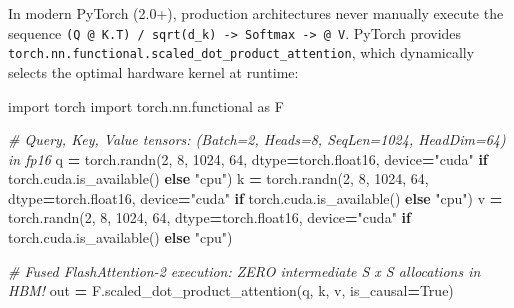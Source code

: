\documentclass[
  letterpaper,
]{scrbook}
\newenvironment{Shaded}{\begin{snugshade}}{\end{snugshade}}
\newcommand{\CommentTok}[1]{\textcolor[rgb]{0.56,0.35,0.01}{\textit{#1}}}
\newcommand{\ControlFlowTok}[1]{\textcolor[rgb]{0.13,0.29,0.53}{\textbf{#1}}}
\newcommand{\DecValTok}[1]{\textcolor[rgb]{0.00,0.00,0.81}{#1}}
\newcommand{\ImportTok}[1]{#1}
\newcommand{\NormalTok}[1]{#1}
\newcommand{\OperatorTok}[1]{\textcolor[rgb]{0.81,0.36,0.00}{\textbf{#1}}}
\newcommand{\StringTok}[1]{\textcolor[rgb]{0.31,0.60,0.02}{#1}}
\newcommand{\VariableTok}[1]{\textcolor[rgb]{0.00,0.00,0.00}{#1}}
\begin{document}
\begin{tcolorbox}[enhanced jigsaw, arc=.35mm, bottomrule=.15mm, bottomtitle=1mm, breakable, colback=white, colbacktitle=quarto-callout-note-color!10!white, colframe=quarto-callout-note-color-frame, coltitle=black, left=2mm, leftrule=.75mm, opacityback=0, opacitybacktitle=0.6, rightrule=.15mm, title=\textcolor{quarto-callout-note-color}{\faInfo}\hspace{0.5em}{PyTorch Systems Bridge:
\texttt{torch.nn.functional.scaled\_dot\_product\_attention} (SDPA)}, titlerule=0mm, toprule=.15mm, toptitle=1mm]

In modern PyTorch (2.0+), production architectures never manually
execute the sequence
\texttt{(Q\ @\ K.T)\ /\ sqrt(d\_k)\ -\textgreater{}\ Softmax\ -\textgreater{}\ @\ V}.
PyTorch provides
\texttt{torch.nn.functional.scaled\_dot\_product\_attention}, which
dynamically selects the optimal hardware kernel at runtime:

\begin{Shaded}
\begin{Highlighting}[]
\ImportTok{import}\NormalTok{ torch}
\ImportTok{import}\NormalTok{ torch.nn.functional }\ImportTok{as}\NormalTok{ F}

\CommentTok{\# Query, Key, Value tensors: (Batch=2, Heads=8, SeqLen=1024, HeadDim=64) in fp16}
\NormalTok{q }\OperatorTok{=}\NormalTok{ torch.randn(}\DecValTok{2}\NormalTok{, }\DecValTok{8}\NormalTok{, }\DecValTok{1024}\NormalTok{, }\DecValTok{64}\NormalTok{, dtype}\OperatorTok{=}\NormalTok{torch.float16, device}\OperatorTok{=}\StringTok{"cuda"} \ControlFlowTok{if}\NormalTok{ torch.cuda.is\_available() }\ControlFlowTok{else} \StringTok{"cpu"}\NormalTok{)}
\NormalTok{k }\OperatorTok{=}\NormalTok{ torch.randn(}\DecValTok{2}\NormalTok{, }\DecValTok{8}\NormalTok{, }\DecValTok{1024}\NormalTok{, }\DecValTok{64}\NormalTok{, dtype}\OperatorTok{=}\NormalTok{torch.float16, device}\OperatorTok{=}\StringTok{"cuda"} \ControlFlowTok{if}\NormalTok{ torch.cuda.is\_available() }\ControlFlowTok{else} \StringTok{"cpu"}\NormalTok{)}
\NormalTok{v }\OperatorTok{=}\NormalTok{ torch.randn(}\DecValTok{2}\NormalTok{, }\DecValTok{8}\NormalTok{, }\DecValTok{1024}\NormalTok{, }\DecValTok{64}\NormalTok{, dtype}\OperatorTok{=}\NormalTok{torch.float16, device}\OperatorTok{=}\StringTok{"cuda"} \ControlFlowTok{if}\NormalTok{ torch.cuda.is\_available() }\ControlFlowTok{else} \StringTok{"cpu"}\NormalTok{)}

\CommentTok{\# Fused FlashAttention{-}2 execution: ZERO intermediate S x S allocations in HBM!}
\NormalTok{out }\OperatorTok{=}\NormalTok{ F.scaled\_dot\_product\_attention(q, k, v, is\_causal}\OperatorTok{=}\VariableTok{True}\NormalTok{)}
\end{Highlighting}
\end{Shaded}


\end{tcolorbox}
\end{document}

